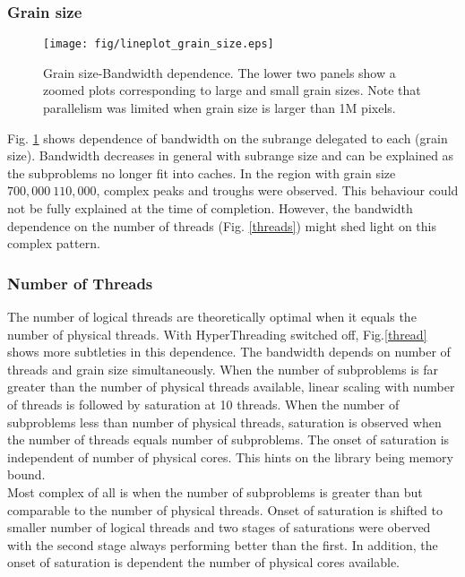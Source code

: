 \documentclass[journal]{IEEEtran}
\begin{document}
\subsubsection{Grain size}
\begin{figure}[h]
\centering
\texttt{[image: fig/lineplot\_grain\_size.eps]}
\caption{Grain size-Bandwidth dependence. The lower two panels show a zoomed plots corresponding to large and small grain sizes. Note that parallelism was limited when grain size is larger than \texttildelow 1M pixels.}\label{grain_size}

\end{figure}
Fig. \ref{grain_size} shows dependence of bandwidth on the subrange delegated to each (grain size). Bandwidth decreases in general with subrange size and can be explained as the subproblems no longer fit into caches. In the region with grain size $700,000 ~ 110,000$, complex peaks and troughs were observed. This behaviour could not be fully explained at the time of completion. However, the bandwidth dependence on the number of threads (Fig. \ref{threads}) might shed light on this complex pattern. \\

\subsubsection{Number of Threads}
The number of logical threads are theoretically optimal when it equals the number of physical threads. With HyperThreading switched off, Fig.\ref{thread} shows more subtleties in this dependence. The bandwidth depends on number of threads and grain size simultaneously. When the number of subproblems is far greater than the number of physical threads available, linear scaling with number of threads is followed by saturation at 10 threads. When the number of subproblems less than number of physical threads, saturation is observed when the number of threads equals number of subproblems. The onset of saturation is independent of number of physical cores. This hints on the library being memory bound. \\

Most complex of all is when the number of subproblems is greater than but comparable to the number of physical threads. Onset of saturation is shifted to smaller number of logical threads and two stages of saturations were oberved with the second stage always performing better than the first. In addition, the onset of saturation is dependent the number of physical cores available. \\
\end{document}

